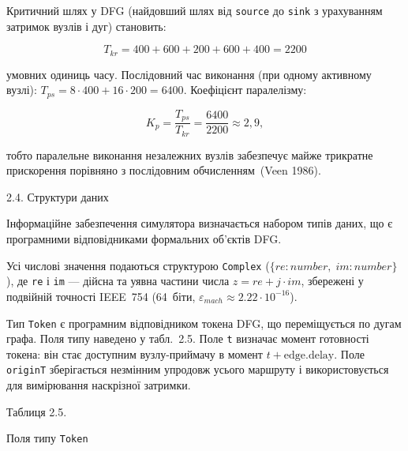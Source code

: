 Критичний шлях у DFG (найдовший шлях від \texttt{source} до
\texttt{sink} з урахуванням затримок вузлів і дуг) становить:

\[T_{kr} = 400 + 600 + 200 + 600 + 400 = 2200\]

умовних одиниць часу. Послідовний час виконання (при одному активному
вузлі): \(T_{ps}=8\cdot400+16\cdot200=6400\). Коефіцієнт паралелізму:

\[K_{p} = \frac{T_{ps}}{T_{kr}} = \frac{6400}{2200} \approx 2{,}9,\]

тобто паралельне виконання незалежних вузлів забезпечує майже трикратне
прискорення порівняно з послідовним обчисленням~(Veen 1986).

\protect{}\label{_Toc228121462}{}2.4. Структури даних

Інформаційне забезпечення симулятора визначається набором типів даних,
що є програмними відповідниками формальних об'єктів DFG.

Усі числові значення подаються структурою \texttt{Complex}
(\(\{re: number,\;im: number\}\)), де \texttt{re} і \texttt{im} ---
дійсна та уявна частини числа \(z=re+j\cdot im\), збережені у подвійній
точності IEEE~754 (64~біти, \(\varepsilon_{mach}\approx2.22\cdot10^{-16}\)).

Тип \texttt{Token} є програмним відповідником токена DFG, що
переміщується по дугам графа. Поля типу наведено у табл.~2.5. Поле
\texttt{t} визначає момент готовності токена: він стає доступним
вузлу-приймачу в момент \(t+\text{edge.delay}\). Поле \texttt{originT}
зберігається незмінним упродовж усього маршруту і використовується для
вимірювання наскрізної затримки.

Таблиця 2.5.

Поля типу \texttt{Token}


